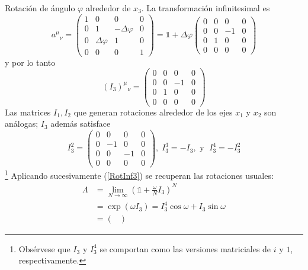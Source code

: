 \begin{example}
Rotación de ángulo $\varphi$ alrededor de $x_3$. La transformación infinitesimal es
	\begin{equation}\label{RotInf3}
		a^{\mu}{}_{\nu}=	\begin{pmatrix}
							1 & 0 & 0 & 0 \\
							0 & 1 & -\Delta \varphi & 0 \\
							0 & \Delta \varphi & 1 & 0 \\
							0 & 0 & 0 & 1	
							\end{pmatrix}
		= \mathbb{1}+\Delta \varphi \begin{pmatrix}
								0 & 0 & 0 & 0\\
								0 & 0 & -1 & 0 \\
								0 & 1 & 0 & 0 \\
								0 & 0 & 0 & 0
								\end{pmatrix}
	\end{equation}
	y por lo tanto
	\begin{equation}
	(I_3)^{\mu}{}_{\nu}=\begin{pmatrix}
								0 & 0 & 0 & 0\\
								0 & 0 & -1 & 0 \\
								0 & 1 & 0 & 0 \\
								0 & 0 & 0 & 0
								\end{pmatrix}
	\end{equation}
	Las matrices $I_1, I_2$ que generan rotaciones alrededor de los ejes $x_1$ y $x_2$ son análogas; $I_3$ además satisface
	\begin{equation}
	I_3^2=\begin{pmatrix} 0&0&0&0\\ 0&-1&0&0\\ 0&0&-1&0\\ 0&0&0&0 \end{pmatrix}, \; I_3^3=-I_3, \text{ y } \; I_3^4=-I_3^2
	\end{equation}\footnote{Obsérvese que $I_3$ y $I_3^4$ se comportan como las versiones matriciales de $i$ y $1$, respectivamente.}
	 Aplicando sucesivamente (\ref{RotInf3}) se recuperan las rotaciones usuales:
	\begin{align*}
	\Lambda &= \lim_{N\rightarrow \infty}\left( \mathbb{1}+\frac{\omega}{N}I_3\right)^N\\
	&= \exp{\left(\omega I_3\right)}=I_3^4 \cos{\omega}+I_3 \sin{\omega}\\
	&=\begin{pmatrix}

\end{pmatrix}
\end{align*}
\end{example}
